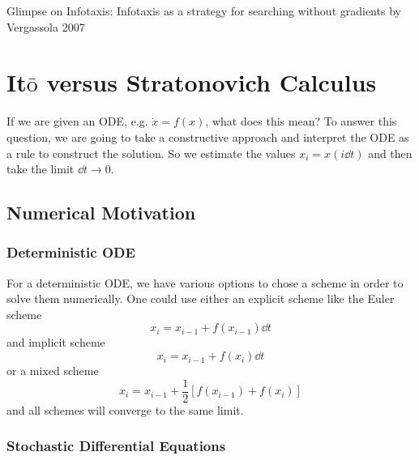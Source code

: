 \documentclass{notebook}
\begin{document}
Glimpse on Infotaxis: Infotaxis as a strategy for searching without gradients by Vergassola 2007


\chapter{It$\bar{\mathrm{o}}$ versus Stratonovich Calculus}

If we are given an ODE, e.g. $\dot{x} = f(x)$, what does this mean? To answer this question, we are going to take a constructive approach and interpret the ODE as a rule to construct the solution. So we estimate the values $x_i = x(i \dd{t})$ and then take the limit $\dd{t} \to 0$.

\section{Numerical Motivation}

\subsection*{Deterministic ODE} 

For a deterministic ODE, we have various options to chose a scheme in order to solve them numerically. One could use either an explicit scheme like the Euler scheme 
%
\begin{equation}
	x_i = x_{i-1} + f(x_{i-1}) \dd{t}
\end{equation}
%
and implicit scheme 
%
\begin{equation}
	x_i = x_{i-1} + f(x_i) \dd{t}
\end{equation}
%
or a mixed scheme
%
\begin{equation}
	x_i = x_{i-1} + \frac{1}{2} [f(x_{i-1}) + f(x_i)]
\end{equation}
%
and all schemes will converge to the same limit.

\subsection*{Stochastic Differential Equations} 
\end{document}
